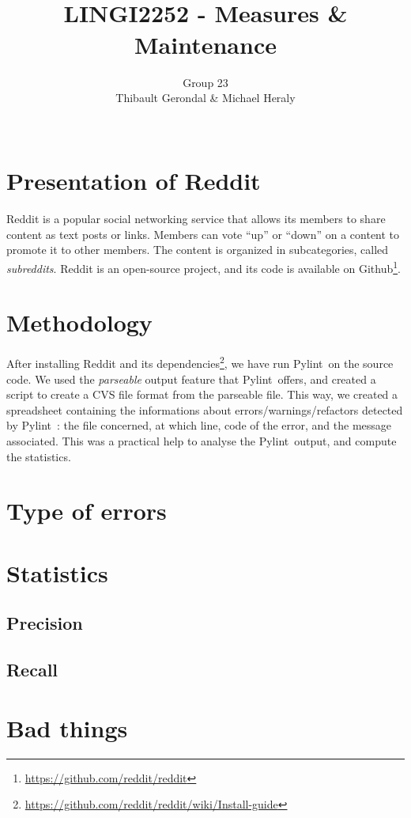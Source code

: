 \documentclass[11pt, a4paper]{article}
\title{\tbf{UCL} \\
	LINGI2252 - Measures \& Maintenance}
\author{Group 23 \\
		Thibault Gerondal \& Michael Heraly \\
		\\
		\tit{Teacher: Kim Mens}}
\newcommand{\tit}[1]{\textit{#1}}
\newcommand{\pyl}{\textsf{Pylint}\ }
\begin{document}
\maketitle


\section*{Presentation of Reddit}

Reddit is a popular social networking service that allows its members to share content as text posts or links.
Members can vote ``up'' or ``down'' on a content to promote it to other members.
The content is organized in subcategories, called \tit{subreddits}.
Reddit is an open-source project, and its code is available on Github\footnote{\url{https://github.com/reddit/reddit}}.


\section{Methodology}

After installing Reddit and its dependencies\footnote{\url{https://github.com/reddit/reddit/wiki/Install-guide}}, we have run \pyl on the source code.
We used the \tit{parseable} output feature that \pyl offers, and created a script to create a CVS file format from the parseable file.
This way, we created a spreadsheet containing the informations about errors/warnings/refactors detected by \pyl: the file concerned, at which line, code of the error, and the message associated.
This was a practical help to analyse the \pyl output, and compute the statistics.


\section{Type of errors}


\section{Statistics}

\subsection*{Precision}


\subsection*{Recall}


\section{Bad things}
\end{document}

